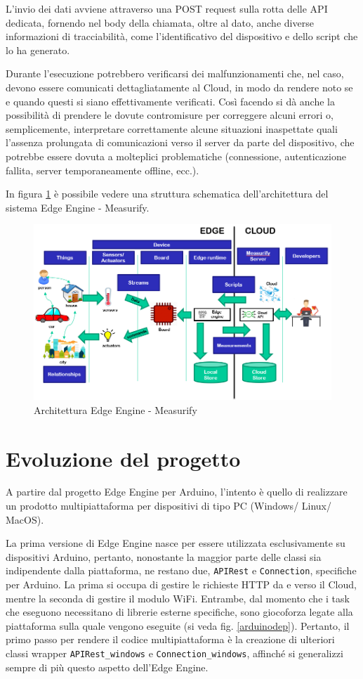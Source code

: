 L'invio dei dati avviene attraverso una POST request sulla rotta delle API dedicata, fornendo nel body della chiamata, oltre al dato, anche diverse informazioni di tracciabilità, come l'identificativo del dispositivo e dello script che lo ha generato.

Durante l’esecuzione potrebbero verificarsi dei malfunzionamenti che, nel caso, devono essere comunicati dettagliatamente al Cloud, in modo da rendere noto se e quando questi si siano effettivamente verificati. Così facendo si dà anche la possibilità di prendere le dovute contromisure per correggere alcuni errori o, semplicemente, interpretare correttamente alcune situazioni inaspettate quali l'assenza prolungata di comunicazioni verso il server da parte del dispositivo, che potrebbe essere dovuta a molteplici problematiche (connessione, autenticazione fallita, server temporaneamente offline, ecc.).

In figura \ref{edgecloud} è possibile vedere una struttura schematica dell'architettura del sistema Edge Engine - Measurify.

\begin{figure}[H]
	\centering
	\includegraphics[width=\linewidth]{pics/edgearch}
	\caption{Architettura Edge Engine - Measurify}
	\label{edgecloud}
\end{figure}

\section{Evoluzione del progetto}
A partire dal progetto Edge Engine per Arduino, l’intento è quello di realizzare un prodotto multipiattaforma per dispositivi di tipo PC (Windows/ Linux/ MacOS).

La prima versione di Edge Engine nasce per essere utilizzata esclusivamente su dispositivi Arduino, pertanto, nonostante la maggior parte delle classi sia indipendente dalla piattaforma, ne restano due, \texttt{APIRest} e \texttt{Connection}, specifiche per Arduino. La prima si occupa di gestire le richieste HTTP da e verso il Cloud, mentre la seconda di gestire il modulo WiFi. Entrambe, dal momento che i task che eseguono necessitano di librerie esterne specifiche, sono giocoforza legate alla piattaforma sulla quale vengono eseguite (si veda fig. \ref{arduinodep}). Pertanto, il primo passo per rendere il codice multipiattaforma è la creazione di ulteriori classi wrapper \texttt{APIRest\_windows} e \texttt{Connection\_windows}, affinché si generalizzi sempre di più questo aspetto dell'Edge Engine.

